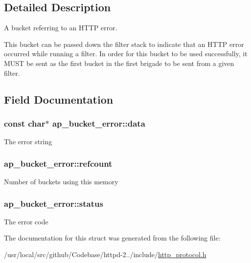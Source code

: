 \subsection{Detailed Description}
A bucket referring to an H\+T\+TP error. 

This bucket can be passed down the filter stack to indicate that an H\+T\+TP error occurred while running a filter. In order for this bucket to be used successfully, it M\+U\+ST be sent as the first bucket in the first brigade to be sent from a given filter. 

\subsection{Field Documentation}
\subsubsection[{\texorpdfstring{data}{data}}]{\setlength{\rightskip}{0pt plus 5cm}const char$\ast$ ap\+\_\+bucket\+\_\+error\+::data}\hypertarget{structap__bucket__error_a29a06548c68ecb88939c5ebb8b043826}{}\label{structap__bucket__error_a29a06548c68ecb88939c5ebb8b043826}
The error string 
\subsubsection[{\texorpdfstring{refcount}{refcount}}]{ ap\+\_\+bucket\+\_\+error\+::refcount}\hypertarget{structap__bucket__error_a4df3d73934d26dec62dd05312975bb53}{}\label{structap__bucket__error_a4df3d73934d26dec62dd05312975bb53}
Number of buckets using this memory 
\subsubsection[{\texorpdfstring{status}{status}}]{ ap\+\_\+bucket\+\_\+error\+::status}\hypertarget{structap__bucket__error_a7866fe685d7b0a09232731025c001976}{}\label{structap__bucket__error_a7866fe685d7b0a09232731025c001976}
The error code 

The documentation for this struct was generated from the following file\+:\begin{DoxyCompactItemize}
\item 
/usr/local/src/github/\+Codebase/httpd-\/2../include/\hyperlink{http__protocol_8h}{http\+\_\+protocol.\+h}\end{DoxyCompactItemize}
